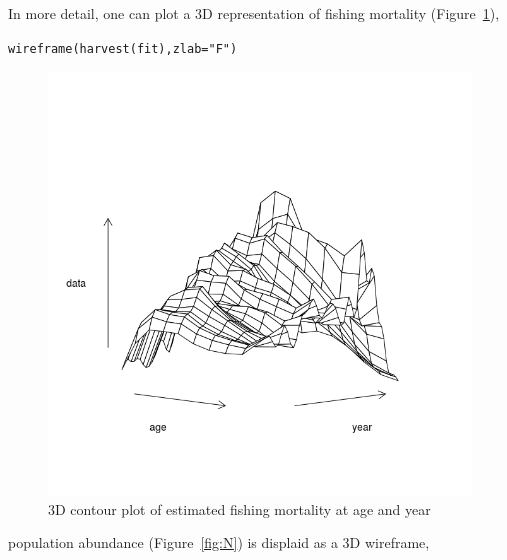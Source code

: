 \documentclass[a4paper,english,10pt]{article}\usepackage[]{graphicx}\usepackage[]{color}
\makeatletter
\newcommand{\hlstr}[1]{\textcolor[rgb]{0.063,0.58,0.627}{#1}}%
\newcommand{\hlstd}[1]{\textcolor[rgb]{0.196,0.196,0.196}{#1}}%
\newcommand{\hlkwc}[1]{\textcolor[rgb]{0,0.631,0.314}{#1}}%
\newcommand{\hlkwd}[1]{\textcolor[rgb]{0.78,0.227,0.412}{#1}}%
\newenvironment{kframe}{%
 \def\at@end@of@kframe{}%
 \ifinner\ifhmode%
  \def\at@end@of@kframe{\end{minipage}}%
  \begin{minipage}{\columnwidth}%
 \fi\fi%
 \def\FrameCommand##1{\hskip\@totalleftmargin \hskip-\fboxsep
 \colorbox{shadecolor}{##1}\hskip-\fboxsep
     \hskip-\linewidth \hskip-\@totalleftmargin \hskip\columnwidth}%
 \MakeFramed {\advance\hsize-\width
   \@totalleftmargin\z@ \linewidth\hsize
   \@setminipage}}%
 {\par\unskip\endMakeFramed%
 \at@end@of@kframe}
\newenvironment{knitrout}{}{} %
\makeatother
\begin{document}
In more detail, one can plot a 3D representation of fishing mortality (Figure~\ref{fig:F}),

\begin{knitrout}
\color{fgcolor}\begin{kframe}
\begin{alltt}
\hlkwd{wireframe}\hlstd{(}\hlkwd{harvest}\hlstd{(fit),} \hlkwc{zlab} \hlstd{=} \hlstr{"F"}\hlstd{)}
\end{alltt}
\end{kframe}\begin{figure}[H]

{\centering \includegraphics[width=.9\linewidth]{figure/F-1} 

}

\caption[3D contour plot of estimated fishing mortality at age and year]{3D contour plot of estimated fishing mortality at age and year}\label{fig:F}
\end{figure}


\end{knitrout}

population abundance (Figure~\ref{fig:N}) is displaid as a 3D wireframe,
\end{document}
